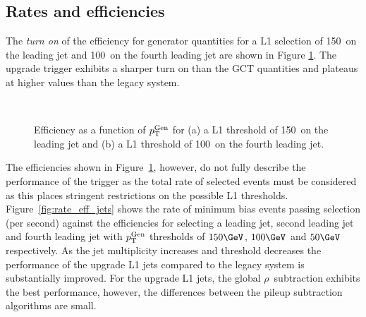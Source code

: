 \subsection{Rates and efficiencies}

The \emph{turn on} of the efficiency for generator quantities for a L1 selection of 150\GeV~on the leading jet
and 100\GeV~on the fourth leading jet are shown in Figure \ref{fig:turnon}. The upgrade trigger exhibits a sharper turn on
than the GCT quantities and plateaus at higher values than the legacy system. 

\begin{figure}
    \begin{center} 
	~
	\caption{Efficiency as a function of ${p_{\text T}^{\text{Gen}}}$ for (a) a L1 threshold of 150\GeV~on the leading jet and (b) 
	a L1 threshold of 100\GeV~on the fourth leading jet.}
	    \label{fig:turnon}
    \end{center} 
\end{figure}

The efficiencies shown in Figure~\ref{fig:turnon}, however, do not fully describe the performance 
of the trigger as the total rate of selected events must be considered as this places 
stringent restrictions on the possible L1 thresholds. Figure~\ref{fig:rate_eff_jets} shows the rate of 
minimum bias events passing selection (per second) against the efficiencies for selecting 
a leading jet, second leading jet and fourth leading jet with ${p_{\text T}^{\text{Gen}}}$ thresholds of $150\GeV$,
$100\GeV$ and $50\GeV$ respectively. As the jet multiplicity increases and threshold decreases
the performance of the upgrade L1 jets compared to the legacy system is substantially improved.
For the upgrade L1 jets, the global $\rho$~subtraction exhibits the best performance, however, the differences 
between the pileup subtraction algorithms are small.

